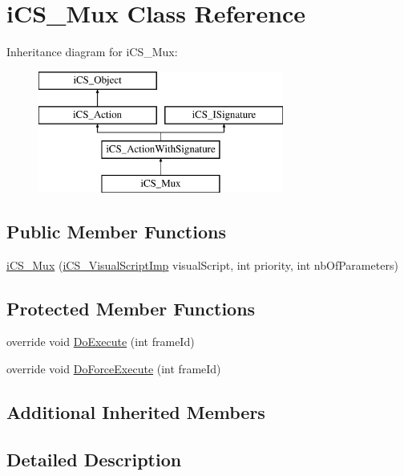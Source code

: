 \hypertarget{classi_c_s___mux}{\section{i\+C\+S\+\_\+\+Mux Class Reference}
\label{classi_c_s___mux}
}
Inheritance diagram for i\+C\+S\+\_\+\+Mux\+:\begin{figure}[H]
\begin{center}
\leavevmode
\includegraphics[height=4.000000cm]{classi_c_s___mux}
\end{center}
\end{figure}
\subsection*{Public Member Functions}
\begin{DoxyCompactItemize}
\item 
\hyperlink{classi_c_s___mux_a9aa1da5d8d43ae743762552e27d4d82e}{i\+C\+S\+\_\+\+Mux} (\hyperlink{classi_c_s___visual_script_imp}{i\+C\+S\+\_\+\+Visual\+Script\+Imp} visual\+Script, int priority, int nb\+Of\+Parameters)
\end{DoxyCompactItemize}
\subsection*{Protected Member Functions}
\begin{DoxyCompactItemize}
\item 
override void \hyperlink{classi_c_s___mux_ab752bcded7ab2362e0c14812f44a8939}{Do\+Execute} (int frame\+Id)
\item 
override void \hyperlink{classi_c_s___mux_a9c366d473ce12d073422431a1cbfc460}{Do\+Force\+Execute} (int frame\+Id)
\end{DoxyCompactItemize}
\subsection*{Additional Inherited Members}


\subsection{Detailed Description}


